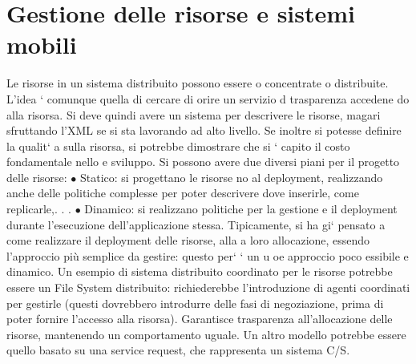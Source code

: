 \documentclass[a4paper,12pt]{article}
\begin{document}
\section{Gestione delle risorse e sistemi mobili}
Le risorse in un sistema distribuito possono essere o concentrate o distribuite.
L'idea ` comunque quella di cercare di orire un servizio d trasparenza accedene
do alla risorsa.
Si deve quindi avere un sistema per descrivere le risorse, magari sfruttando
l'XML se si sta lavorando ad alto livello. Se inoltre si potesse definire la qualit`
a
sulla risorsa, si potrebbe dimostrare che si ` capito il costo fondamentale nello
e
sviluppo.
Si possono avere due diversi piani per il progetto delle risorse:
$\bullet$ Statico: si progettano le risorse no al deployment, realizzando anche delle
politiche complesse per poter descrivere dove inserirle, come replicarle,. . .
$\bullet$ Dinamico: si realizzano politiche per la gestione e il deployment durante
l'esecuzione dell'applicazione stessa.
Tipicamente, si ha gi` pensato a come realizzare il deployment delle risorse, alla
a
loro allocazione, essendo l'approccio più semplice da gestire: questo per` ` un
u
oe
approccio poco essibile e dinamico.
Un esempio di sistema distribuito coordinato per le risorse potrebbe essere
un File System distribuito: richiederebbe l'introduzione di agenti coordinati per
gestirle (questi dovrebbero introdurre delle fasi di negoziazione, prima di poter
fornire l'accesso alla risorsa). Garantisce trasparenza all'allocazione delle risorse,
mantenendo un comportamento uguale. Un altro modello potrebbe essere quello
basato su una service request, che rappresenta un sistema C/S.
\end{document}
